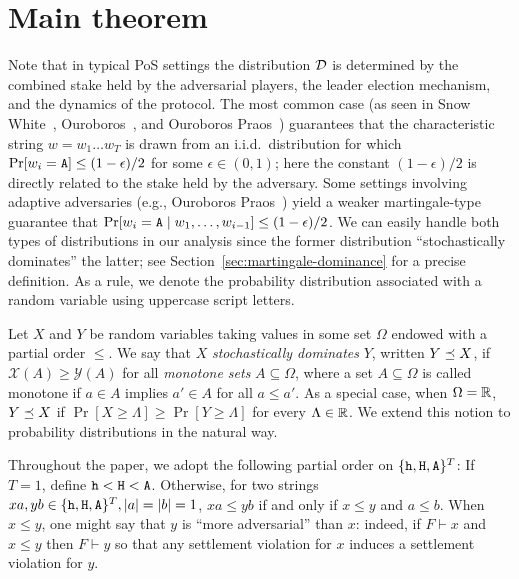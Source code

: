   \section{Main theorem}
  Note that in typical PoS settings the distribution $\mathcal{D}$
  is determined by the combined stake held by the adversarial players,
  the leader election mechanism, and the dynamics of the protocol. The
  most common case (as seen in Snow White~\cite{SnowWhite},
  Ouroboros~\cite{Ouroboros}, and Ouroboros Praos~\cite{Praos})
  guarantees that the characteristic string $w = w_1 \ldots w_T$ is
  drawn from an i.i.d.\ distribution for which
  $\Pr[w_i = \mathtt{A}] \leq (1 - \epsilon)/2$ for some $\epsilon \in (0, 1)$;
  here the constant $(1-\epsilon)/2$ is directly related to the stake
  held by the adversary. Some settings involving adaptive adversaries
  (e.g., Ouroboros Praos~\cite{Praos}) yield a weaker martingale-type
  guarantee that
  $\Pr[w_i = \mathtt{A} \mid w_1, \ldots, w_{i-1}] \leq (1 - \epsilon)/2$.  We
  can easily handle both types of distributions in our analysis since
  the former distribution ``stochastically dominates'' the latter; 
  see Section~\ref{sec:martingale-dominance} for a precise definition.
  As a rule, we denote the
  probability distribution associated with a random variable using
  uppercase script letters. 
  \begin{definition}\label{def:dominance-mh} 
    Let $X$ and $Y$ be random variables taking values in some set $\Omega$ 
    endowed with a partial order $\leq$. 
    We say that $X$ \emph{stochastically dominates} $Y$, 
    written $Y \preceq X$, if 
    $
      \mathcal{X}(A) \geq \mathcal{Y}(A)
    $ 
    for all \emph{monotone sets} $A \subseteq \Omega$, 
    where a set $A \subseteq \Omega$ is called 
    monotone if $a \in A$ implies $a' \in A$ for all $a \leq a'$.
    As a special case, when $\Omega = \mathbb{R}$,  $Y \preceq X$ if
    $\Pr[X \geq \Lambda] \geq \Pr[Y \geq \Lambda]$
    for every $\Lambda \in \mathbb{R}$.  
    We extend this notion to probability
    distributions in the natural way.
  \end{definition}

  Throughout the paper, we adopt the following partial order on
  $\{\mathtt{h}, \mathtt{H}, \mathtt{A}\}^T$: If $T = 1$, define $\mathtt{h} < \mathtt{H} < \mathtt{A}$.  Otherwise,
  for two strings $xa, yb \in \{\mathtt{h}, \mathtt{H}, \mathtt{A}\}^T, |a| = |b| = 1$,
  $xa \leq yb$ if and only if $x \leq y$ and $a \leq b$. When
  $x \leq y$, one might say that $y$ is ``more adversarial'' than $x$:
  indeed, if $F \vdash x$ and $x \leq y$ then $F \vdash y$ so that any
  settlement violation for $x$ induces a settlement violation for $y$.

